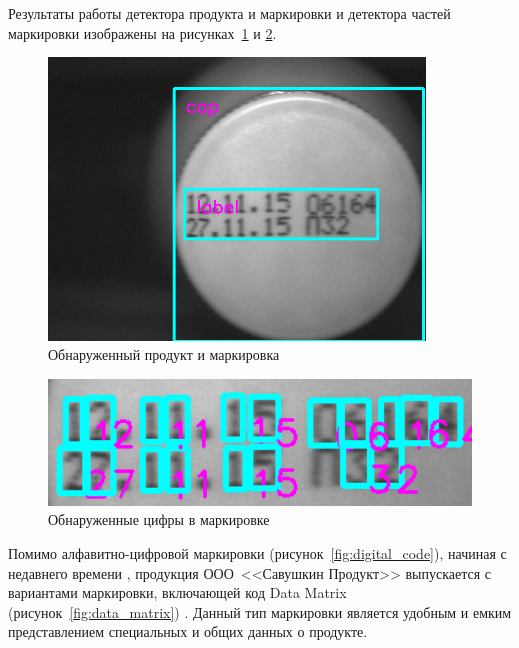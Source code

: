 Результаты работы детектора продукта и маркировки и детектора частей маркировки изображены на рисунках~\ref{fig:product_detect}  и \ref{fig:numbers_detect}.

\begin{figure}[!ht]
	\centering
	\includegraphics[width=10cm]{man-source/images/ch4/pic4-25.png}
	\caption{Обнаруженный продукт и маркировка}
	\label{fig:product_detect}
\end{figure}

\begin{figure}[!ht]
	\centering
	\includegraphics[width=12cm]{man-source/images/ch4/pic4-26.png}
	\caption{Обнаруженные цифры в маркировке}
	\label{fig:numbers_detect}
\end{figure}

Помимо алфавитно-цифровой маркировки (рисунок~\ref{fig:digital_code}), начиная с недавнего времени \cite{milk}, продукция ООО~<<Савушкин Продукт>> выпускается с вариантами маркировки, включающей код Data Matrix (рисунок~\ref{fig:data_matrix}) \cite{datamatrix}. Данный тип маркировки является удобным и емким представлением специальных и общих данных о продукте. 


